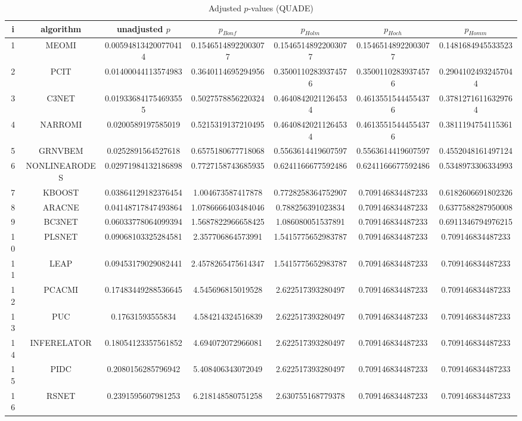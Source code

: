 \documentclass[a4paper,10pt]{article}
\begin{document}
\begin{landscape}
\begin{table}[!htp]
\centering\scriptsize
\caption{Adjusted $p$-values (QUADE)}
\begin{tabular}{ccccccc}
i&algorithm&unadjusted $p$&$p_{Bonf}$&$p_{Holm}$&$p_{Hoch}$&$p_{Homm}$\\
\hline
1&MEOMI&0.005948134200770414&0.15465148922003077&0.15465148922003077&0.15465148922003077&0.1481684945533523\\
2&PCIT&0.01400044113574983&0.3640114695294956&0.35001102839374576&0.35001102839374576&0.29041024932457044\\
3&C3NET&0.019336841754693555&0.5027578856220324&0.46408420211264534&0.46135515444554376&0.37812716116329764\\
4&NARROMI&0.0200589197585019&0.5215319137210495&0.46408420211264534&0.46135515444554376&0.3811194754115361\\
5&GRNVBEM&0.0252891564527618&0.6575180677718068&0.5563614419607597&0.5563614419607597&0.4552048161497124\\
6&NONLINEARODES&0.02971984132186898&0.7727158743685935&0.6241166677592486&0.6241166677592486&0.5348973306334993\\
7&KBOOST&0.03864129182376454&1.004673587417878&0.7728258364752907&0.709146834487233&0.6182606691802326\\
8&ARACNE&0.04148717847493864&1.0786666403484046&0.788256391023834&0.709146834487233&0.6377588287950008\\
9&BC3NET&0.06033778064099394&1.5687822966658425&1.086080051537891&0.709146834487233&0.6911346794976215\\
10&PLSNET&0.09068103325284581&2.357706864573991&1.5415775652983787&0.709146834487233&0.709146834487233\\
11&LEAP&0.09453179029082441&2.4578265475614347&1.5415775652983787&0.709146834487233&0.709146834487233\\
12&PCACMI&0.17483449288536645&4.545696815019528&2.622517393280497&0.709146834487233&0.709146834487233\\
13&PUC&0.17631593555834&4.584214324516839&2.622517393280497&0.709146834487233&0.709146834487233\\
14&INFERELATOR&0.18054123357561852&4.694072072966081&2.622517393280497&0.709146834487233&0.709146834487233\\
15&PIDC&0.2080156285796942&5.408406343072049&2.622517393280497&0.709146834487233&0.709146834487233\\
16&RSNET&0.2391595607981253&6.218148580751258&2.630755168779378&0.709146834487233&0.709146834487233\\

\end{tabular}
\end{table}
\end{landscape}
\end{document}
